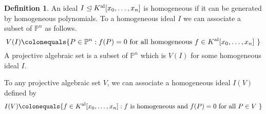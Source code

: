 \documentclass{dcthesis}
\newcommand{\PP}{\mathbb P}
\newcommand{\CC}{\mathbb C}
\newcommand{\defi}[1]{\textsf{#1}}
\newcommand{\mm}[1]{{\color{blue} \sf MM: [#1]}}
\newcommand{\Kal}{{{K}^{\textup{al}}}}
\newtheorem{theorem}[prop]{Theorem}
\theoremstyle{definition}
\newtheorem{definition}[prop]{Definition}
\theoremstyle{remark}
\numberwithin{equation}{section}
\numberwithin{figure}{section}
\begin{document}
{{\begin{definition}
      An ideal $I\trianglelefteq\Kal[x_0,\dots,x_n]$
      is \defi{homogeneous}
      if it can be generated by homogeneous polynomials.
      To a homogeneous ideal $I$ we can associate a subset of
      $\PP^n$ as follows.
      \[
        V(I)\colonequals
        \{P\in\PP^n : f(P)=0\text{ for all homogeneous $f\in\Kal[x_0,\dots,x_n]$ }\}
      \]
      A \defi{projective algebraic set}
      is a subset of $\PP^n$ which is $V(I)$
      for some homogeneous ideal $I$.
    \end{definition}
    To any projective algebraic set $V$,
    we can associate a homogeneous ideal $I(V)$ defined by
    \begin{equation}
      \label{eqn:projectivealgebraicsetideal}
      I(V)
      \colonequals
      \{f\in\Kal[x_0,\dots,x_n]:f \text{ is homogeneous and }f(P) = 0\text{ for all $P\in V$ }\}
    \end{equation}
  }
}
\end{document}
